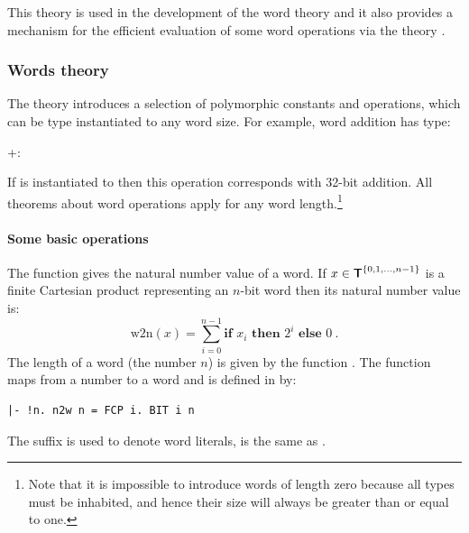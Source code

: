 {This theory is used in the development of the word theory and it also provides
a mechanism for the efficient evaluation of some word operations via the theory
.

\subsubsection{Words theory}

The theory  introduces a selection of polymorphic constants and operations, which can be type instantiated to any word size.  For example, word addition
has type:
\begin{hol}
+:\worda\rarr\worda\rarr\worda
\end{hol}
If  is instantiated to  then this operation corresponds with 32-bit addition.
All theorems about word operations apply for any word length.\footnote{Note
that it is impossible to introduce words of length zero because all types
must be inhabited, and hence their size will always be greater than or equal to
one.}

\paragraph{Some basic operations}

The function  gives the natural number value of a
word.  If $x\in\mbox{${\sf T}\!\!\!\!{\sf T}$}^{\{0, 1, \ldots, n - 1\}}$ is a finite Cartesian product
representing an $n$-bit word then its natural number value is:
\[ \mathrm{w2n}(x) = \sum_{i = 0}^{n - 1} \textbf{if } x_i \textbf{ then } 2^i
\textbf{ else } 0\ .\]
The length of a word (the number $n$) is given by the function
.
The function  maps from a number to a word and is
defined in \HOL{} by:
\begin{hol}
\begin{verbatim}
|- !n. n2w n = FCP i. BIT i n
\end{verbatim}
\end{hol}
The suffix  is used to denote word literals, \eg{}
 is the same as .

}
